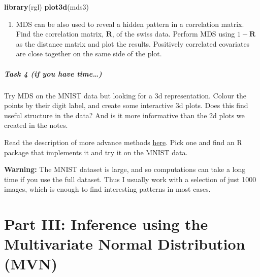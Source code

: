 \documentclass[]{book}
\newenvironment{Shaded}{\begin{snugshade}}{\end{snugshade}}
\newcommand{\KeywordTok}[1]{\textcolor[rgb]{0.13,0.29,0.53}{\textbf{#1}}}
\newcommand{\NormalTok}[1]{#1}
\providecommand{\tightlist}{%
  \setlength{\itemsep}{0pt}\setlength{\parskip}{0pt}}
\let\oldparagraph\paragraph
\renewcommand{\paragraph}[1]{\oldparagraph{#1}\mbox{}}
\theoremstyle{definition}
\theoremstyle{definition}
\theoremstyle{definition}
\theoremstyle{remark}
\begin{document}
\begin{Shaded}
\begin{Highlighting}[]
\KeywordTok{library}\NormalTok{(rgl)}
\KeywordTok{plot3d}\NormalTok{(mds3)}
\end{Highlighting}
\end{Shaded}

\begin{enumerate}
\def\labelenumi{\roman{enumi}.}
\setcounter{enumi}{2}
\tightlist
\item
  MDS can be also used to reveal a hidden pattern in a correlation matrix. Find the correlation matrix, \(\mathbf R\), of the swiss data. Perform MDS using \(1-\mathbf R\) as the distance matrix and plot the results. Positively correlated covariates are close together on the same side of the plot.
\end{enumerate}

\hypertarget{task-4-if-you-have-time}{%
\paragraph{Task 4 (if you have time\ldots{})}\label{task-4-if-you-have-time}}

Try MDS on the MNIST data but looking for a 3d representation. Colour the points by their digit label, and create some interactive 3d plots. Does this find useful structure in the data? And is it more informative than the 2d plots we created in the notes.

Read the description of more advance methods \href{https://colah.github.io/posts/2014-10-Visualizing-MNIST/}{here}. Pick one and find an R package that implements it and try it on the MNIST data.

\textbf{Warning:} The MNIST dataset is large, and so computations can take a long time if you use the full dataset. Thus I usually work with a selection of just 1000 images, which is enough to find interesting patterns in most cases.

\hypertarget{part-iii-inference-using-the-multivariate-normal-distribution-mvn}{%
\chapter*{Part III: Inference using the Multivariate Normal Distribution (MVN)}\label{part-iii-inference-using-the-multivariate-normal-distribution-mvn}}
\end{document}
